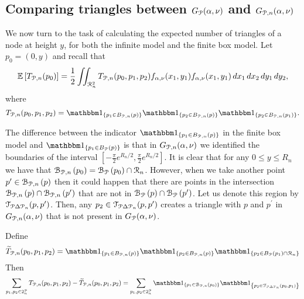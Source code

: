 
\subsection{Comparing triangles between $G_{{\mathcal P}}(\alpha,\nu)$ and $G_{{\mathcal P},n}(\alpha,\nu)$}

We now turn to the task of calculating the expected number of triangles of a node at height $y$, for both the infinite model and the finite box model. Let $p_0 = (0,y)$ and recall that 
\[
	\mathbb{E}\left[T_{{\mathcal P},n}(p_0)\right] = \frac{1}{2}\iint_{{\mathcal R}_n^2} T_{{\mathcal P},n}(p_0,p_1,p_2)
	f_{\alpha,\nu}(x_1,y_1) f_{\alpha,\nu}(x_1,y_1) \, dx_1 \, dx_2 \, dy_1 \, dy_2,
\]
where
\[
	T_{\Pcal,n}(p_0,p_1,p_2) = \ind{p_1 \in B_{\Pcal,n}(p)}\ind{p_2 \in B_{\Pcal,n}(p)}\ind{p_2 \in B_{\Pcal,n}(p_1)}.
\]

The difference between the indicator $\ind{p_1 \in B_{\Pcal,n}(p)}$ in the finite box model and $\ind{p_1 \in B_{\Pcal}(p)}$ is that in $G_{{\mathcal P},n}(\alpha,\nu)$ we identified the boundaries of the interval $[-\frac{\pi}{2}e^{R_n/2}, \frac{\pi}{2} e^{R_n/2}]$. It is clear that for any $0 \le y \le R_n$ we have that ${\mathcal B}_{{\mathcal P},n}\left(p_0\right) = {\mathcal B}_{{\mathcal P}}\left(p_0\right) \cap {\mathcal R}_n$. However, when we take another point $p^\prime \in {\mathcal B}_{{\mathcal P},n}\left(p\right)$ then it could happen that there are points in the intersection ${\mathcal B}_{{\mathcal P},n}\left(p\right) \cap {\mathcal B}_{{\mathcal P},n}\left(p^\prime\right)$ that are not in ${\mathcal B}_{{\mathcal P}}\left(p\right) \cap {\mathcal B}_{{\mathcal P}}\left(p^\prime\right)$. Let us denote this region by $\mathcal{T}_{{\mathcal P} \Delta {\mathcal P}_n}(p,p^\prime)$. Then, any $p_2 \in \mathcal{T}_{{\mathcal P} \Delta {\mathcal P}_n}(p,p^\prime)$ creates a triangle with $p$ and $p^\prime$ in $G_{{\mathcal P},n}(\alpha,\nu)$ that is not present in $G_{{\mathcal P}}(\alpha, \nu)$.  

Define
\begin{equation}\label{eq:def_tilde_triangle_indicator}
	\widetilde{T}_{\Pcal,n}(p_0,p_1,p_2) = \ind{p_1 \in B_{\Pcal,n}(p)}\ind{p_2 \in B_{\Pcal,n}(p)}\ind{p_2 \in B_{\Pcal}(p_1) \cap \Rcal_n}
\end{equation}
Then
\[
	\sum_{p_1,p_2 \in 2^\Pcal_n} T_{\Pcal,n}(p_0,p_1,p_2) - \widetilde{T}_{\Pcal,n}(p_0,p_1,p_2)
	= \sum_{p_1,p_2 \in 2^\Pcal_n} \ind{p_1 \in \BallPon{p_0}} \ind{p_2 \in \mathcal{T}_{\Pcal \Delta \Pcal_n}(p_0,p_1)}
\]

